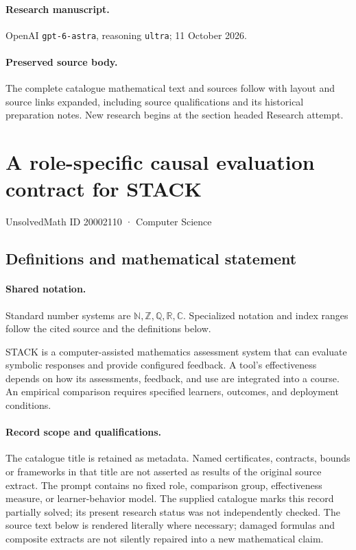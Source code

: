 \documentclass[11pt]{article}
\begin{document}
\paragraph{Research manuscript.} OpenAI \texttt{gpt-6-astra}, reasoning \texttt{ultra}; 11 October 2026.
\paragraph{Preserved source body.} The complete catalogue mathematical text and sources follow with layout and source links expanded, including source qualifications and its historical preparation notes. New research begins at the section headed Research attempt.

\section{A role-specific causal evaluation contract for STACK}\label{20002110}
{\small UnsolvedMath ID 20002110 · Computer Science}
\subsection{Definitions and mathematical statement}

\paragraph{Shared notation.}Standard number systems are $\mathbb N,\mathbb Z,\mathbb Q,\mathbb R,\mathbb C$. Specialized notation and index ranges follow the cited source and the definitions below.


STACK is a computer-assisted mathematics assessment system that can evaluate symbolic responses and provide configured feedback. A tool's effectiveness depends on how its assessments, feedback, and use are integrated into a course. An empirical comparison requires specified learners, outcomes, and deployment conditions.
\paragraph{Record scope and qualifications.}
The catalogue title is retained as metadata. Named certificates, contracts, bounds or frameworks in that title are not asserted as results of the original source extract.
The prompt contains no fixed role, comparison group, effectiveness measure, or learner-behavior model. The supplied catalogue marks this record partially solved; its present research status was not independently checked.
The source text below is rendered literally where necessary; damaged formulas and composite extracts are not silently repaired into a new mathematical claim.
\end{document}
